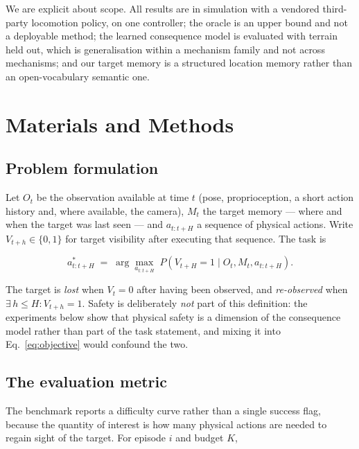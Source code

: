 \documentclass[utf8]{FrontiersinHarvard}
\begin{document}
We are explicit about scope. All results are in simulation with a vendored third-party
locomotion policy, on one controller; the oracle is an upper bound and not a deployable
method; the learned consequence model is evaluated with terrain held out, which is
generalisation within a mechanism family and not across mechanisms; and our target
memory is a structured location memory rather than an open-vocabulary semantic one.

\section{Materials and Methods}
\label{sec:methods}

\subsection{Problem formulation}

Let $O_t$ be the observation available at time $t$ (pose, proprioception, a short action
history and, where available, the camera), $M_t$ the target memory --- where and when the
target was last seen --- and $a_{t:t+H}$ a sequence of physical actions. Write
$V_{t+h} \in \{0,1\}$ for target visibility after executing that sequence. The task is

\begin{equation}
a^{*}_{t:t+H} \;=\; \arg\max_{a_{t:t+H}} \; P\!\left(V_{t+H}=1 \mid O_t, M_t, a_{t:t+H}\right).
\label{eq:objective}
\end{equation}

The target is \emph{lost} when $V_t=0$ after having been observed, and
\emph{re-observed} when $\exists\, h \le H : V_{t+h}=1$. Safety is deliberately
\emph{not} part of this definition: the experiments below show that physical safety is
a dimension of the consequence model rather than part of the task statement, and mixing
it into Eq.~\ref{eq:objective} would confound the two.

\subsection{The evaluation metric}

The benchmark reports a difficulty curve rather than a single success flag, because the
quantity of interest is how many physical actions are needed to regain sight of the
target. For episode $i$ and budget $K$,
\end{document}
